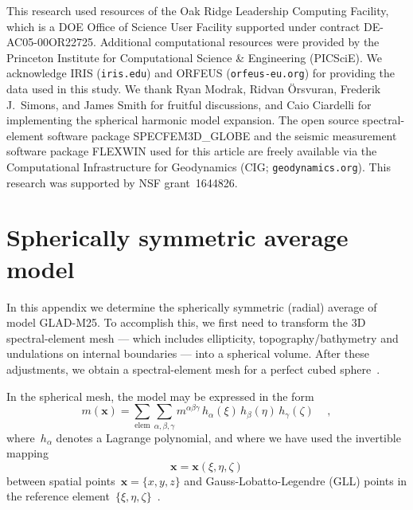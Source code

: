 \begin{acknowledgments}
This research used resources of the Oak Ridge Leadership Computing Facility,
which is a DOE Office of Science User Facility supported under contract DE-AC05-00OR22725.
Additional computational resources were provided by the Princeton Institute
for Computational Science \& Engineering (PICSciE).
We acknowledge IRIS ({\tt iris.edu}) and ORFEUS ({\tt orfeus-eu.org}) for
providing the data used in this study.
We thank Ryan Modrak, Ridvan \"{O}rsvuran, Frederik J.\ Simons, and James Smith for fruitful discussions,
and Caio Ciardelli for implementing the spherical harmonic model expansion.
The open source spectral-element software package SPECFEM3D\_GLOBE and
the seismic measurement software package FLEXWIN used for this article are
 freely available via the Computational Infrastructure for Geodynamics
 (CIG; {\tt geodynamics.org}).
 This research was supported by NSF grant~1644826.
\end{acknowledgments}

\newpage

\appendix

\chapter{Spherically symmetric average model}
\label{chapter:1Dmodel}

In this appendix we determine the spherically symmetric (radial) average of model GLAD-M25.
To accomplish this,
we first need to transform the 3D spectral-element mesh --- which includes ellipticity, topography/bathymetry and undulations on internal boundaries --- into a spherical volume.
After these adjustments, we obtain a spectral-element mesh for a perfect cubed sphere~\cite{KoTr02a}.

In the spherical mesh, the model may be expressed in the form
\begin{equation}
    m(\mathbf{x})=\sum_{\mathrm{elem}}\sum_{\alpha,\beta,\gamma}m^{\alpha\beta\gamma}\,h_{\alpha}(\xi)\,h_{\beta}(\eta)\,h_{\gamma}(\zeta)\,
    \quad ,
\end{equation}
where~$h_\alpha$ denotes a Lagrange polynomial, and where we have used the invertible mapping
\begin{equation}
    \mathbf{x}=\mathbf{x}(\xi,\eta,\zeta)
\end{equation}
between spatial points~$\mathbf{x}=\{x,y,z\}$ and Gauss-Lobatto-Legendre (GLL) points in the reference element~$\{\xi,\eta,\zeta\}$~\cite{KoTr99}.

